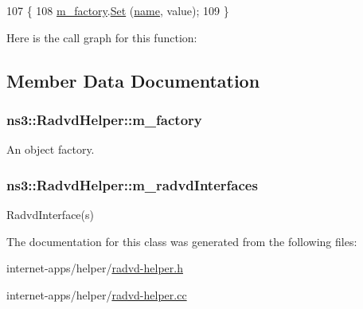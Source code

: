 \begin{DoxyCode}
107 \{
108   \hyperlink{classns3_1_1RadvdHelper_a3be43d0114cbbc58e581f621d2f77e35}{m\_factory}.\hyperlink{classns3_1_1ObjectFactory_aef5c0d5019c96bdf01cefd1ff83f4a68}{Set} (\hyperlink{generate__test__data__lte__spectrum__model_8m_ab74e6bf80237ddc4109968cedc58c151}{name}, value);
109 \}
\end{DoxyCode}


Here is the call graph for this function\+:




\subsection{Member Data Documentation}
\subsubsection[{\texorpdfstring{m\+\_\+factory}{m_factory}}]{ ns3\+::\+Radvd\+Helper\+::m\+\_\+factory\hspace{0.3cm}{\ttfamily [private]}}\hypertarget{classns3_1_1RadvdHelper_a3be43d0114cbbc58e581f621d2f77e35}{}\label{classns3_1_1RadvdHelper_a3be43d0114cbbc58e581f621d2f77e35}


An object factory. 

\subsubsection[{\texorpdfstring{m\+\_\+radvd\+Interfaces}{m_radvdInterfaces}}]{ ns3\+::\+Radvd\+Helper\+::m\+\_\+radvd\+Interfaces\hspace{0.3cm}{\ttfamily [private]}}\hypertarget{classns3_1_1RadvdHelper_a90792a45cd3b20d6eb1f4bc0b4dd20ba}{}\label{classns3_1_1RadvdHelper_a90792a45cd3b20d6eb1f4bc0b4dd20ba}


Radvd\+Interface(s) 



The documentation for this class was generated from the following files\+:\begin{DoxyCompactItemize}
\item 
internet-\/apps/helper/\hyperlink{radvd-helper_8h}{radvd-\/helper.\+h}\item 
internet-\/apps/helper/\hyperlink{radvd-helper_8cc}{radvd-\/helper.\+cc}\end{DoxyCompactItemize}
